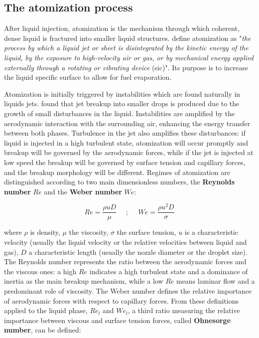 \subsection*{The atomization process}

After liquid injection, atomization is the mechanism through which coherent, dense liquid is fractured into smaller liquid structures.  define atomization as "\textsl{the process by which a liquid jet or sheet is disintegrated by the kinetic energy of the liquid, by the exposure to
high-velocity air or gas, or by mechanical energy applied externally through a rotating or vibrating device} (sic)". Its purpose is to increase the liquid specific surface to allow for fuel evaporation.

Atomization is initially triggered by instabilities which are found naturally in liquids jets.  found that jet breakup into smaller drops is produced due to the growth of small disturbances in the liquid. Instabilities are amplified by the aerodynamic interaction with the surrounding air, enhancing the energy transfer between both phases. Turbulence in the jet also amplifies these disturbances: if liquid is injected in a high turbulent state, atomization will occur promptly and breakup will be governed by the aerodynamic forces, while if the jet is injected at low speed the breakup will be governed by surface tension and capillary forces, and the breakup morphology will be different. Regimes of atomization are distinguished according to two main dimensionless numbers, the \textbf{Reynolds number} $Re$ and the \textbf{Weber number} $We$:

\begin{equation}
\label{eq:ch1_intro_Re_and_We_general_definitions}
	Re = \frac{\rho u D}{\mu} ~~~~~~ ;  ~~~~~~ We = \frac{\rho u^2 D}{\sigma}
\end{equation}

where $\rho$ is density, $\mu$ the viscosity, $\sigma$ the surface tension, $u$ is a characteristic velocity (usually the liquid velocity or the relative velocities between liquid and gas), $D$ a characteristic length (usually the nozzle diameter or the droplet size). The Reynolds number represents the ratio between the aerodynamic forces and the viscous ones: a high $Re$ indicates a high turbulent state and a dominance of inertia as the main breakup mechanism, while a low $Re$ means laminar flow and a predominant role of viscosity. The Weber number defines the relative importance of aerodynamic forces with respect to capillary forces. From these definitions applied to the liquid phase, $Re_l$ and $We_l$, a third ratio measuring the relative importance between viscous and surface tension forces, called \textbf{Ohnesorge number}, can be defined:

